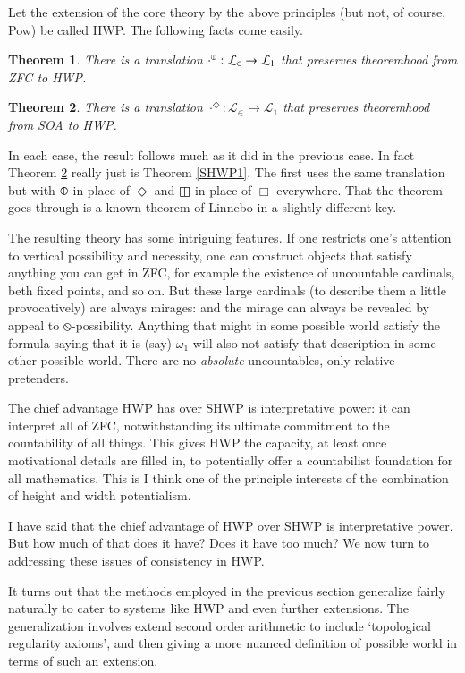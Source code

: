 \documentclass{article}
\newtheorem{theorem}{Theorem}
\begin{document}
Let the extension of the core theory by the above principles (but not, of course, Pow)
be called HWP. The following facts come easily.
\begin{theorem}\label{HWP0}
    There is a translation $\cdot^\circledbar : \mathcal{L}_\in \to \mathcal{L}_1$
    that preserves theoremhood from ZFC to HWP.
\end{theorem}
\begin{theorem}\label{HWP1}
    There is a translation $\cdot^\Diamond : \mathcal{L}_\in \to \mathcal{L}_1$
    that preserves theoremhood from SOA to HWP.
\end{theorem}
In each case, the result follows much as it did in the previous case. In fact 
Theorem \ref{HWP1} really just is Theorem \ref{SHWP1}. The first uses the same translation
but with $\circledbar$ in place of $\Diamond$ and $\boxbar$ in place of $\Box$ 
everywhere. That the theorem goes through is a known theorem of Linnebo in a slightly 
different key.

The resulting theory has some intriguing features. If one restricts one's attention 
to vertical possibility and necessity, one can construct objects that 
satisfy anything you can get in ZFC, for example the existence of uncountable cardinals, 
beth fixed points, and so on. But these large cardinals (to describe them a little provocatively) are always mirages: 
and the mirage can always be revealed 
by appeal to $\circledbslash$-possibility. Anything that might in some possible world 
satisfy the formula saying that it is (say) $\omega_1$ will also not satisfy that 
description in some other possible world. There are no \emph{absolute} uncountables, only 
relative pretenders.

The chief advantage HWP has over SHWP is interpretative power: it can interpret all 
of ZFC, notwithstanding its ultimate commitment to the countability of all things.
This gives HWP the capacity, at least once motivational details are filled in,
to potentially offer a countabilist foundation for all mathematics. This is I think
one of the principle interests of the combination of height and width potentialism.

I have said that the chief advantage of HWP over SHWP is interpretative power. But 
how much of that does it have? Does it have too much? We now turn to addressing 
these issues of consistency in HWP.

It turns out that the methods employed in the previous section generalize fairly 
naturally to cater to systems like HWP and even further extensions. The generalization
involves extend second order arithmetic to include `topological regularity axioms',
and then giving a more nuanced definition of possible world in terms of such an extension.
\end{document}
